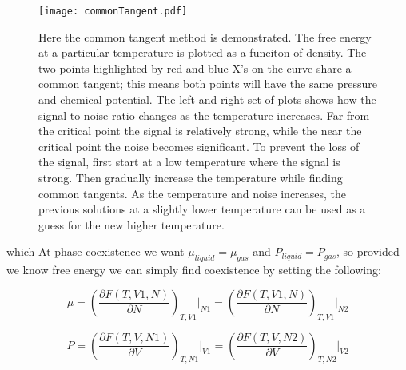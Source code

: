 \begin{figure}[h]
\vspace*{-7mm}
\hspace*{-6mm}
	\centering
	\texttt{[image: commonTangent.pdf]}
	\caption{\scriptsize Here the common tangent method is demonstrated. The free energy at a particular temperature is plotted as a funciton of density. The two points highlighted by red and blue X's on the curve share a common tangent; this means both points will have the same pressure and chemical potential. The left and right set of plots shows how the signal to noise ratio changes as the temperature increases. Far from the critical point the signal is relatively strong, while the near the critical point the noise becomes significant. To prevent the loss of the signal, first start at a low temperature where the signal is strong. Then gradually increase the temperature while finding common tangents. As the temperature and noise increases, the previous solutions at a slightly lower temperature can be used as a guess for the new higher temperature.}
	\label{fig:FdispVsff}
\end{figure}

which  At phase coexistence we want $\mu_{liquid}=\mu_{gas}$ and $P_{liquid}=P_{gas}$, so provided we know free energy we can simply find coexistence by setting the following:

\begin{equation}\label{eq:methodsMu}
\mu=\left(\frac{\partial F(T,V1,N)}{\partial N}\right)_{T,V1}\Bigr|_{N1}=\left(\frac{\partial F(T,V1,N)}{\partial N}\right)_{T,V1}\Bigr|_{N2}
\end{equation}

\begin{equation}\label{eq:methodsP}
P=\left(\frac{\partial F(T,V,N1)}{\partial V}\right)_{T,N1}\Bigr|_{V1}=\left(\frac{\partial F(T,V,N2)}{\partial V}\right)_{T,N2}\Bigr|_{V2}
\end{equation}

